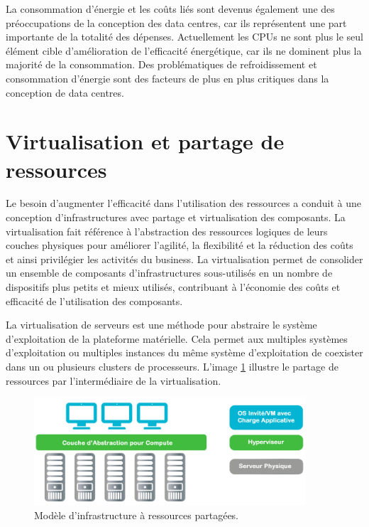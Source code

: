 La consommation d'énergie et les coûts liés sont devenus également une des préoccupations de la conception des data centres, car ils représentent une part importante de la totalité des dépenses. Actuellement les CPUs ne sont plus le seul élément cible d'amélioration de l'efficacité énergétique, car ils ne dominent plus la majorité de la consommation. Des problématiques de refroidissement et consommation d'énergie sont des facteurs de plus en plus critiques dans la conception de data centres.\cite{datacenterAsComputerIntro} \cite{dataCenterEvolution}

\section{Virtualisation et partage de ressources}

Le besoin d'augmenter l'efficacité dans l'utilisation des ressources a conduit à une conception d'infrastructures avec partage et virtualisation des composants. La virtualisation fait référence à l'abstraction des ressources logiques de leurs couches physiques pour améliorer l'agilité, la flexibilité et la réduction des coûts et ainsi privilégier les activités du business. La virtualisation permet de consolider un ensemble de composants d'infrastructures sous-utilisés en un nombre de dispositifs plus petits et mieux utilisés, contribuant à l'économie des coûts et efficacité de l'utilisation des composants.

La virtualisation de serveurs est une méthode pour abstraire le système d'exploitation de la plateforme matérielle. Cela permet aux multiples systèmes d'exploitation ou multiples instances du même système d'exploitation de coexister dans un ou plusieurs clusters de processeurs. L'image \ref{virtinfra} illustre le partage de ressources par l'intermédiaire de la virtualisation.\\

\begin{figure}[h]
\begin{center}
\includegraphics[width=0.9\textwidth]{images/shared_infa_virt_T} 
\caption{Modèle d'infrastructure à ressources partagées. \cite{journeySDDC}}\label{virtinfra}
\end{center}
\end{figure}

